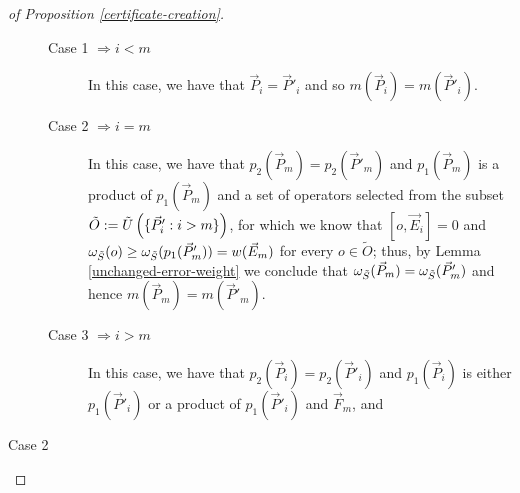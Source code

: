\documentclass[twocolumn,showpacs,preprintnumbers,amsmath,amssymb,nofootinbib,pra,floatfix]{revtex4-1}
\newcommand{\lst}{\vec}
\newcommand{\set}{\tilde}
\begin{document}
\begin{proof}[of Proposition \ref{certificate-creation}]
\begin{description}
\begin{description}
\item[Case 1 $\Rightarrow i < m$]
In this case, we have that $\lst P_i=\lst P'_i$ and so $m(\lst P_i)=m(\lst P'_i)$.

\item[Case 2 $\Rightarrow i = m$]
In this case, we have that $p_2(\lst P_m)=p_2(\lst P'_m)$ and $p_1(\lst P_m)$ is a product of $p_1(\lst P_m)$ and a set of operators selected from the subset $\set O := \set U\paren{\{\lst P_i' : i > m \}}$, for which we know that $[o,\lst E_i]=0$ and $\om_{\set S}(o)\ge \om_{\set S}(p_1(\lst P'_m))=w(\lst E_m)$ for every $o\in \set O$;  thus, by Lemma \ref{unchanged-error-weight} we conclude that $\om_{\set S}(\lst P_m)=\om_{\set S}(\lst P'_m)$ and hence $m(\lst P_m)=m(\lst P'_m).$

\item[Case 3 $\Rightarrow i > m$]
In this case, we have that $p_2(\lst P_i)=p_2(\lst P'_i)$ and $p_1(\lst P_i)$ is either $p_1(\lst P'_i)$ or a product of $p_1(\lst P'_i)$ and $\lst F_m$, and 
\end{description}

\item[Case 2]

\end{description}

\end{proof}
\end{document}
